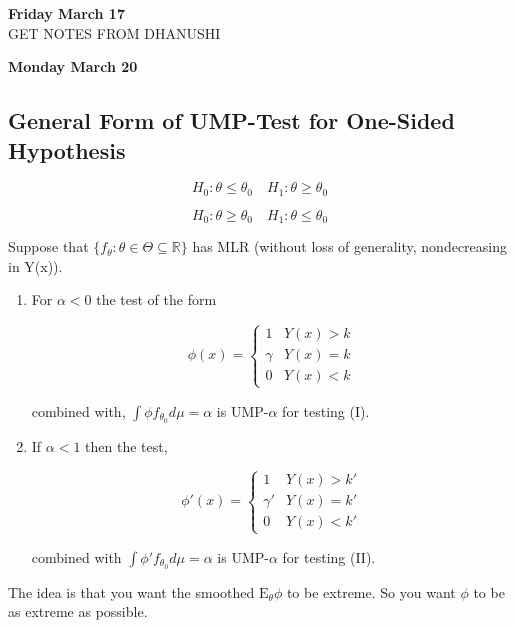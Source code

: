 \documentclass[11pt,fleqn]{book} %
\newcommand{\E}{\mathrm{E}}
\begin{document}
 \textbf{Friday March 17}\\

 GET NOTES FROM DHANUSHI

 \textbf{Monday March 20}\\

 \subsection{General Form of UMP-Test for One-Sided Hypothesis}

 		$$H_0: \theta \leq \theta_0 \quad H_1: \theta \geq \theta_0 $$

 		$$ H_0: \theta \geq \theta_0 \quad H_1: \theta \leq \theta_0$$

 \begin{theorem}[3.2 in class]
 	Suppose that $\{f_\theta: \theta \in \Theta \subseteq \mathbb{R}\}$ has MLR (without loss of generality, nondecreasing in Y(x)). 

 	\begin{enumerate}
 		\item For $\alpha < 0$ the test of the form

 				$$\phi(x) = \left\{ \begin{array}{ll}
 					1 & Y(x) > k\\
 					\gamma & Y(x) = k\\
 					0 & Y(x) < k
 				\end{array}\right.$$

 		combined with,  $\int \phi f_{\theta_0} d\mu = \alpha$ is UMP-$\alpha$ for testing (I).

 		\item If $\alpha < 1$ then the test,

				$$\phi'(x) = \left\{ \begin{array}{ll}
 					1 & Y(x) > k'\\
 					\gamma' & Y(x) = k'\\
 					0 & Y(x) < k'
 				\end{array}\right.$$ 	

 		combined with $\int \phi' f_{\theta_0} d\mu = \alpha$ is UMP-$\alpha$ for testing (II).			
 	\end{enumerate}
 \end{theorem}

 The idea is that you want the smoothed $\E_\theta \phi$ to be extreme. So you want $\phi$ to be as extreme as possible. 
\end{document}
